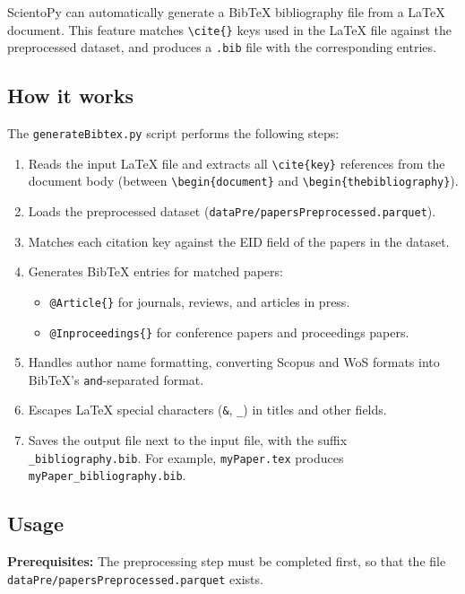\documentclass[10pt,letterpaper]{article}
\begin{document}
ScientoPy can automatically generate a BibTeX bibliography file from a LaTeX document. This feature matches \verb|\cite{}| keys used in the LaTeX file against the preprocessed dataset, and produces a \verb|.bib| file with the corresponding entries.

\subsection{How it works}

The \verb|generateBibtex.py| script performs the following steps:

\begin{enumerate}
\item Reads the input LaTeX file and extracts all \verb|\cite{key}| references from the document body (between \verb|\begin{document}| and \verb|\begin{thebibliography}|).
\item Loads the preprocessed dataset (\verb|dataPre/papersPreprocessed.parquet|).
\item Matches each citation key against the EID field of the papers in the dataset.
\item Generates BibTeX entries for matched papers:
\begin{itemize}
\item \verb|@Article{}| for journals, reviews, and articles in press.
\item \verb|@Inproceedings{}| for conference papers and proceedings papers.
\end{itemize}
\item Handles author name formatting, converting Scopus and WoS formats into BibTeX's \verb|and|-separated format.
\item Escapes LaTeX special characters (\verb|&|, \verb|_|) in titles and other fields.
\item Saves the output file next to the input file, with the suffix \verb|_bibliography.bib|. For example, \verb|myPaper.tex| produces \verb|myPaper_bibliography.bib|.
\end{enumerate}

\subsection{Usage}

\textbf{Prerequisites:} The preprocessing step must be completed first, so that the file \verb|dataPre/papersPreprocessed.parquet| exists.
\end{document}
